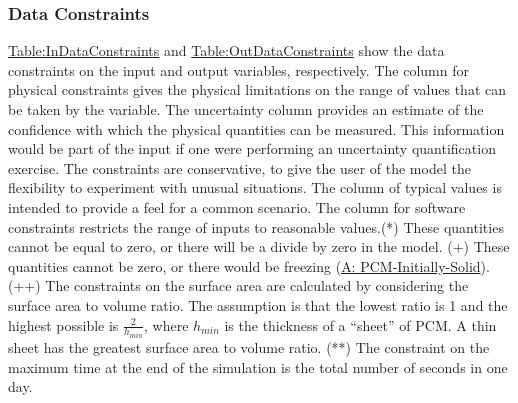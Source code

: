 \documentclass[12pt]{article}
\begin{document}
\subsubsection{Data Constraints}
\label{Sec:DataConstraints}
\hyperref[Table:InDataConstraints]{Table:InDataConstraints} and \hyperref[Table:OutDataConstraints]{Table:OutDataConstraints} show the data constraints on the input and output variables, respectively. The column for physical constraints gives the physical limitations on the range of values that can be taken by the variable. The uncertainty column provides an estimate of the confidence with which the physical quantities can be measured. This information would be part of the input if one were performing an uncertainty quantification exercise. The constraints are conservative, to give the user of the model the flexibility to experiment with unusual situations. The column of typical values is intended to provide a feel for a common scenario. The column for software constraints restricts the range of inputs to reasonable values.(*) These quantities cannot be equal to zero, or there will be a divide by zero in the model. (+) These quantities cannot be zero, or there would be freezing (\hyperref[assumpPIS]{A: PCM-Initially-Solid}). (++) The constraints on the surface area are calculated by considering the surface area to volume ratio. The assumption is that the lowest ratio is 1 and the highest possible is $\frac{2}{{h_{min}}}$, where ${h_{min}}$ is the thickness of a ``sheet'' of PCM. A thin sheet has the greatest surface area to volume ratio. (**) The constraint on the maximum time at the end of the simulation is the total number of seconds in one day.
\end{document}
